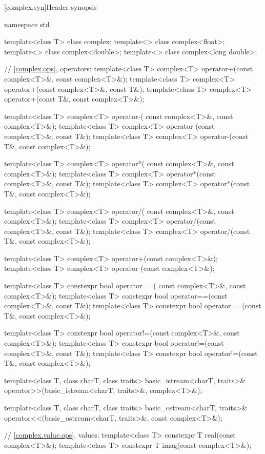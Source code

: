 [complex.syn]{Header  synopsis}

%
\begin{codeblock}
namespace std {
  template<class T> class complex;
  template<> class complex<float>;
  template<> class complex<double>;
  template<> class complex<long double>;

  // \ref{complex.ops}, operators:
  template<class T>
    complex<T> operator+(const complex<T>&, const complex<T>&);
  template<class T> complex<T> operator+(const complex<T>&, const T&);
  template<class T> complex<T> operator+(const T&, const complex<T>&);

  template<class T> complex<T> operator-(
    const complex<T>&, const complex<T>&);
  template<class T> complex<T> operator-(const complex<T>&, const T&);
  template<class T> complex<T> operator-(const T&, const complex<T>&);

  template<class T> complex<T> operator*(
    const complex<T>&, const complex<T>&);
  template<class T> complex<T> operator*(const complex<T>&, const T&);
  template<class T> complex<T> operator*(const T&, const complex<T>&);

  template<class T> complex<T> operator/(
    const complex<T>&, const complex<T>&);
  template<class T> complex<T> operator/(const complex<T>&, const T&);
  template<class T> complex<T> operator/(const T&, const complex<T>&);

  template<class T> complex<T> operator+(const complex<T>&);
  template<class T> complex<T> operator-(const complex<T>&);

  template<class T> constexpr bool operator==(
    const complex<T>&, const complex<T>&);
  template<class T> constexpr bool operator==(const complex<T>&, const T&);
  template<class T> constexpr bool operator==(const T&, const complex<T>&);

  template<class T> constexpr bool operator!=(const complex<T>&, const complex<T>&);
  template<class T> constexpr bool operator!=(const complex<T>&, const T&);
  template<class T> constexpr bool operator!=(const T&, const complex<T>&);

  template<class T, class charT, class traits>
  basic_istream<charT, traits>&
  operator>>(basic_istream<charT, traits>&, complex<T>&);

  template<class T, class charT, class traits>
  basic_ostream<charT, traits>&
  operator<<(basic_ostream<charT, traits>&, const complex<T>&);

  // \ref{complex.value.ops}, values:
  template<class T> constexpr T real(const complex<T>&);
  template<class T> constexpr T imag(const complex<T>&);

}
\end{codeblock}
